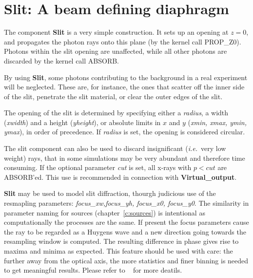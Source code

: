 \section{Slit: A beam defining diaphragm}
\label{s:slit}


The component \textbf{Slit} is a very simple construction.
It sets up an opening at $z=0$, and propagates the photon rays
onto this plane (by the kernel call PROP\_Z0).
Photons within the slit opening are unaffected,
while all other photons are discarded by the kernel call ABSORB.

By using \textbf{Slit}, some photons contributing to the background
in a real experiment will be neglected.
These are, for instance, the ones that scatter off the inner side
of the slit, penetrate the slit material, or clear the outer edges of the slit.

The opening of the slit is determined by specifying either a \textit{radius}, a
width (\textit{xwidth}) and a height (\textit{yheight}), or absolute limits in $x$
and $y$ (\textit{xmin, xmax, ymin, ymax}), in order of precedence.
If \textit{radius} is set, the opening is considered circular.

The slit component can also be used to discard insignificant 
({\em i.e.}\ very low weight)
 rays, that in some simulations may be very abundant and therefore
time consuming. If the optional parameter \textit{cut} is set, all
x-rays with $p<\mathit{cut}$ are ABSORB'ed.
This use is recommended in connection with \textbf{Virtual\_output}.

\textbf{Slit} may be used to model slit diffraction, thourgh judicious use of the resmapling
parameters: \textit{focus\_xw,focus\_yh, focus\_x0, focus\_y0}. The similarity in parameter
naming for sources (chapter~\ref{c:sources}) is intentional as computationally the processes are
the same. If present the focus parameters cause the ray to be regarded as a Huygens wave and a new direction
going towards the resampling window is computed. The resulting difference in phase gives rise to maxima and minima as expected.
This feature should be used with care: the further away from the optical
axis, the more statistics and finer binning is needed to get meaningful results. Please refer to
~\cite{knudsen2013mcxtrace} for more deatils.

